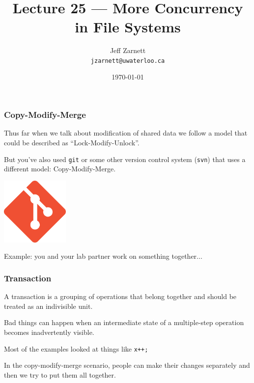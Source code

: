 

\title{Lecture 25 --- More Concurrency in File Systems }

\author{Jeff Zarnett \\ \small \texttt{jzarnett@uwaterloo.ca}}
\date{\today}




\begin{frame}
	\titlepage

\end{frame}


\begin{frame}
	\frametitle{Copy-Modify-Merge}

	Thus far when we talk about modification of shared data we follow a model that could be described as ``Lock-Modify-Unlock''.

	But you've also used \texttt{git} or some other version control system (\texttt{svn}) that uses a different model: Copy-Modify-Merge.

	\begin{center}
		\includegraphics[width=0.25\textwidth]{images/git.png}
	\end{center}

	Example: you and your lab partner work on something together...

\end{frame}


\begin{frame}
	\frametitle{Transaction}

	A \alert{transaction} is a grouping of operations that belong together and should be treated as an indivisible unit.

	Bad things can happen when an intermediate state of a multiple-step operation becomes inadvertently visible.

	Most of the examples looked at things like \texttt{x++;}

	In the copy-modify-merge scenario, people can make their changes separately and then we try to put them all together.

\end{frame}

